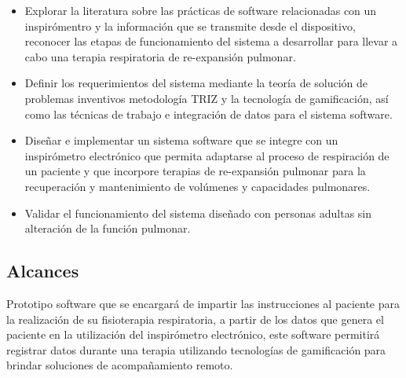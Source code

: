 \documentclass[12pt]{article}
\begin{document}
\begin{itemize}
\item Explorar la literatura sobre las pr\'acticas de software relacionadas con un inspir\'omentro y la informaci\'on que se transmite desde el dispositivo, reconocer las etapas de funcionamiento del sistema a desarrollar para llevar a cabo una terapia respiratoria de  re-expansi\'on pulmonar.

\item Definir los requerimientos del sistema mediante la teor\'ia de soluci\'on de problemas inventivos metodolog\'ia TRIZ y la tecnolog\'ia de gamificaci\'on, as\'i como las t\'ecnicas de trabajo e integraci\'on de datos para el sistema software.

\item Dise\~{n}ar e implementar un sistema software que se integre con un inspir\'ometro electr\'onico que permita adaptarse al proceso de respiraci\'on de un paciente y que incorpore terapias de re-expansi\'on pulmonar para la recuperaci\'on y mantenimiento de vol\'umenes y capacidades pulmonares.


\item Validar el funcionamiento del sistema dise\~{n}ado con personas adultas sin alteraci\'on de la funci\'on pulmonar.  %

\end{itemize}

\subsection{Alcances}

Prototipo software que se encargar\'a de impartir las instrucciones al paciente para la realizaci\'on de su fisioterapia respiratoria, a partir de los datos que genera el paciente en la utilizaci\'on del inspir\'ometro electr\'onico, este software permitir\'a registrar datos durante una terapia utilizando tecnolog\'ias de gamificaci\'on para brindar soluciones de acompa\~{n}amiento remoto. 
\end{document}
